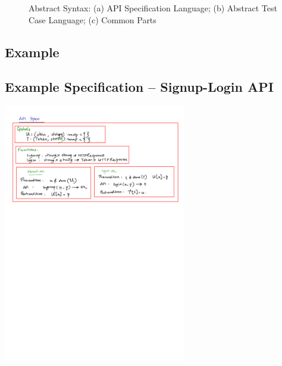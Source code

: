 \documentclass[12pts, a4paper]{article}
\begin{document}
\begin{figure}
%
%
%
%
\caption{Abstract Syntax: (a) API Specification Language; (b) Abstract Test Case Language; (c) Common Parts}
\label{f:abssyn}
\end{figure}

\subsection{Example}
\subsection{Example Specification -- Signup-Login API}
\begin{center}
\includegraphics[width=0.6\textwidth]{../images/spec-AST-1.png}
\end{center}
\end{document}
